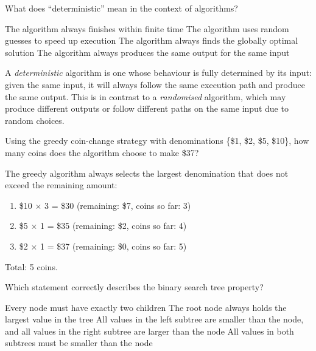 \documentclass[answers]{exam}
\begin{document}
\begin{questions}
\question What does ``deterministic'' mean in the context of algorithms?

\begin{choices}
    \choice The algorithm always finishes within finite time
    \choice The algorithm uses random guesses to speed up execution
    \choice The algorithm always finds the globally optimal solution
    \correctchoice The algorithm always produces the same output for the same input
\end{choices}

\begin{solution}
    A \textit{deterministic} algorithm is one whose behaviour is fully determined by its input: given the same input, it will always follow the same execution path and produce the same output.
    This is in contrast to a \textit{randomised} algorithm, which may produce different outputs or follow different paths on the same input due to random choices.
\end{solution}

\question Using the greedy coin-change strategy with denominations \{\$1, \$2, \$5, \$10\}, how many coins does the algorithm choose to make \$37?

\begin{oneparchoices}
\end{oneparchoices}

\begin{solution}
    The greedy algorithm always selects the largest denomination that does not exceed the remaining amount:
    \begin{enumerate}
        \item \$10 $\times$ 3 = \$30 \quad (remaining: \$7, coins so far: 3)
        \item \$5 $\times$ 1 = \$35 \quad (remaining: \$2, coins so far: 4)
        \item \$2 $\times$ 1 = \$37 \quad (remaining: \$0, coins so far: 5)
    \end{enumerate}
    Total: 5 coins.
\end{solution}

\question Which statement correctly describes the binary search tree property?

\begin{choices}
    \choice Every node must have exactly two children
    \choice The root node always holds the largest value in the tree
    \correctchoice All values in the left subtree are smaller than the node, and all values in the right subtree are larger than the node
    \choice All values in both subtrees must be smaller than the node
\end{choices}


\end{questions}
\end{document}
